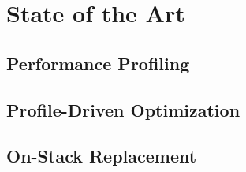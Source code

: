\chapter{State of the Art}

\section{Performance Profiling}

\section{Profile-Driven Optimization}

\section{On-Stack Replacement}